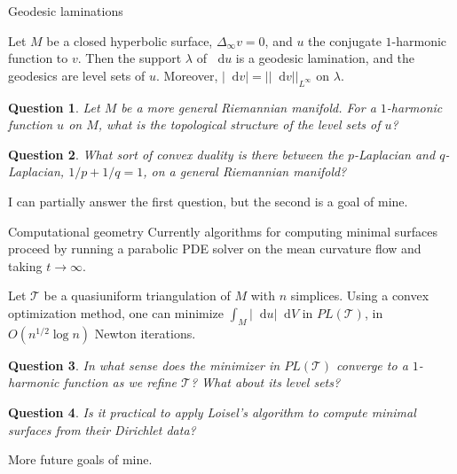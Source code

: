 \documentclass[10pt]{beamer}
\newcommand*\dif{\mathop{}\!\mathrm{d}}
\newtheorem{question}{Question}
\begin{document}
\begin{frame}{Geodesic laminations}
\begin{theorem}
Let $M$ be a closed hyperbolic surface, $\Delta_\infty v = 0$, and $u$ the conjugate $1$-harmonic function to $v$.
Then the support $\lambda$ of $\dif u$ is a geodesic lamination, and the geodesics are level sets of $u$.
Moreover, $|\dif v| = ||\dif v||_{L^\infty}$ on $\lambda$.
\end{theorem}

\pause

\begin{question}
Let $M$ be a more general Riemannian manifold.
For a $1$-harmonic function $u$ on $M$, what is the topological structure of the level sets of $u$?
\end{question}

\pause

\begin{question}
What sort of convex duality is there between the $p$-Laplacian and $q$-Laplacian, $1/p + 1/q = 1$, on a general Riemannian manifold?
\end{question}

\pause

I can partially answer the first question, but the second is a goal of mine.
\end{frame}

\begin{frame}{Computational geometry}
Currently algorithms for computing minimal surfaces proceed by running a parabolic PDE solver on the mean curvature flow and taking $t \to \infty$.

\pause

\begin{theorem}[Loisel '20]
Let $\mathcal T$ be a quasiuniform triangulation of $M$ with $n$ simplices.
Using a convex optimization method, one can minimize $\int_M |\dif u| \dif V$ in $PL(\mathcal T)$, in $O(n^{1/2} \log n)$ Newton iterations.
\end{theorem}

\pause

\begin{question}
In what sense does the minimizer in $PL(\mathcal T)$ converge to a $1$-harmonic function as we refine $\mathcal T$? What about its level sets?
\end{question}

\pause

\begin{question}
Is it practical to apply Loisel's algorithm to compute minimal surfaces from their Dirichlet data?
\end{question}

\pause

More future goals of mine.
\end{frame}
\end{document}
